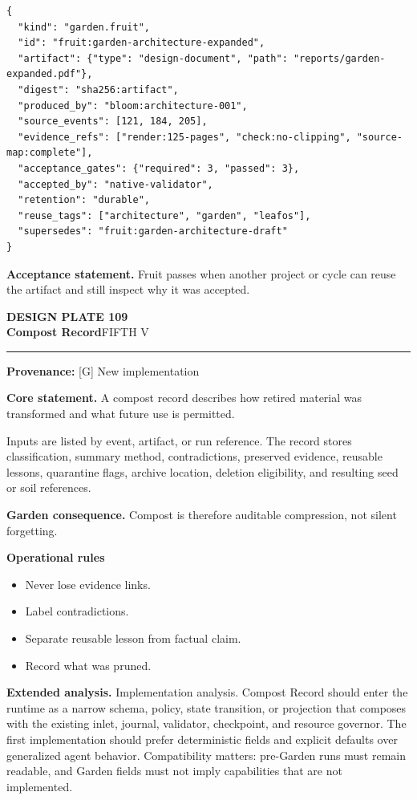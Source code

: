 \documentclass[10pt,letterpaper,oneside]{article}
\newcommand{\prov}[1]{\textcolor{gardenBlue}{\sffamily\footnotesize\textbf{Provenance:} #1}}
\newcommand{\platetitle}[3]{%
  \begin{minipage}[t][0.54in][t]{\textwidth}
  {\sffamily\bfseries\color{gardenDeep}\fontsize{9}{10}\selectfont DESIGN PLATE #1}\\[-1pt]
  {\sffamily\bfseries\color{gardenInk}\fontsize{16.5}{18}\selectfont #2}\hfill{\sffamily\color{gardenGreen}\large #3}
  \end{minipage}\vspace{-2pt}\hrule\vspace{5pt}}
\begin{document}
\begin{lstlisting}
{
  "kind": "garden.fruit",
  "id": "fruit:garden-architecture-expanded",
  "artifact": {"type": "design-document", "path": "reports/garden-expanded.pdf"},
  "digest": "sha256:artifact",
  "produced_by": "bloom:architecture-001",
  "source_events": [121, 184, 205],
  "evidence_refs": ["render:125-pages", "check:no-clipping", "source-map:complete"],
  "acceptance_gates": {"required": 3, "passed": 3},
  "accepted_by": "native-validator",
  "retention": "durable",
  "reuse_tags": ["architecture", "garden", "leafos"],
  "supersedes": "fruit:garden-architecture-draft"
}
\end{lstlisting}
\begin{acceptbox}
\textbf{Acceptance statement.} Fruit passes when another project or cycle can reuse the artifact and still inspect why it was accepted.
\end{acceptbox}
\newpage
\platetitle{109}{Compost Record}{FIFTH V}
\prov{[G] New implementation}
\fontsize{8.85}{10.45}\selectfont
\begin{corebox}
\textbf{Core statement.} A compost record describes how retired material was transformed and what future use is permitted.
\end{corebox}
Inputs are listed by event, artifact, or run reference. The record stores classification, summary method, contradictions, preserved evidence, reusable lessons, quarantine flags, archive location, deletion eligibility, and resulting seed or soil references.

\textbf{Garden consequence.} Compost is therefore auditable compression, not silent forgetting.

\textbf{Operational rules}
\begin{itemize}
\item Never lose evidence links.
\item Label contradictions.
\item Separate reusable lesson from factual claim.
\item Record what was pruned.
\end{itemize}
\textbf{Extended analysis.} Implementation analysis. Compost Record should enter the runtime as a narrow schema, policy, state transition, or projection that composes with the existing inlet, journal, validator, checkpoint, and resource governor. The first implementation should prefer deterministic fields and explicit defaults over generalized agent behavior. Compatibility matters: pre-Garden runs must remain readable, and Garden fields must not imply capabilities that are not implemented.
\end{document}
